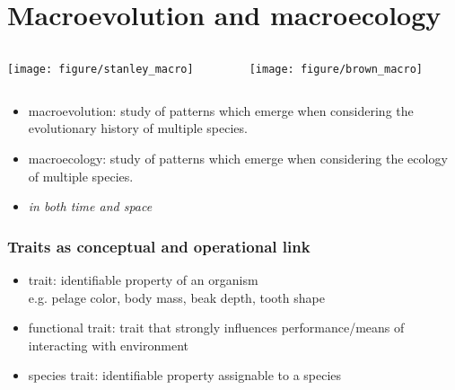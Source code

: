 \documentclass{beamer}
\begin{document}
\section{Macroevolution and macroecology}

\begin{frame}
  \begin{columns}
    \begin{column}{0.5\textwidth}
      \begin{center}
        \texttt{[image: figure/stanley\_macro]}
      \end{center}
    \end{column}
    \begin{column}{0.5\textwidth}
      \begin{center}
        \texttt{[image: figure/brown\_macro]}
      \end{center}
    \end{column}
  \end{columns}
\end{frame}

\begin{frame}
  \begin{definition}
    \begin{itemize}
      \item \alert{macroevolution}: study of patterns which emerge when considering the evolutionary history of multiple species.
      \item \alert{macroecology}: study of patterns which emerge when considering the ecology of multiple species.
      \item \emph{in both time and space}
    \end{itemize}
  \end{definition}
\end{frame}

\begin{frame}
  \frametitle{Traits as conceptual and operational link}

  \begin{definition}
    \begin{itemize}
      \item \alert{trait}: identifiable property of an organism \\e.g. pelage color, body mass, beak depth, tooth shape
      \item \alert{functional trait}: trait that strongly influences performance/means of interacting with environment
      \item \alert{species trait}: identifiable property assignable to a species
    \end{itemize}
  \end{definition}
\end{frame}
\end{document}
